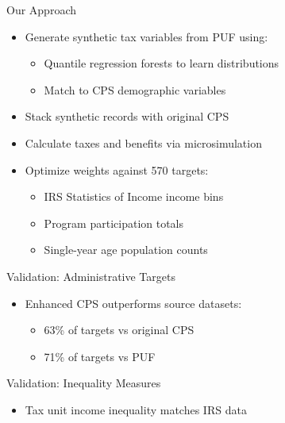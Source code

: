 \documentclass{beamer}
\begin{document}
\begin{frame}{Our Approach}
    \begin{itemize}
        \item Generate synthetic tax variables from PUF using:
        \begin{itemize}
            \item Quantile regression forests to learn distributions
            \item Match to CPS demographic variables
        \end{itemize}
        \pause
        \item Stack synthetic records with original CPS
        \pause
        \item Calculate taxes and benefits via microsimulation
        \pause
        \item Optimize weights against 570 targets:
        \begin{itemize}
            \item IRS Statistics of Income income bins
            \item Program participation totals
            \item Single-year age population counts
        \end{itemize}
    \end{itemize}
\end{frame}

\begin{frame}{Validation: Administrative Targets}
    \begin{itemize}
        \item Enhanced CPS outperforms source datasets:
        \begin{itemize}
            \item 63\% of targets vs original CPS
            \item 71\% of targets vs PUF
        \end{itemize}
    \end{itemize}
\end{frame}

\begin{frame}{Validation: Inequality Measures}
    \begin{itemize}
        \item Tax unit income inequality matches IRS data
        \begin{table}
            \centering
            \begin{table}
                \centering
                
            \end{table}
        \end{table}
    \end{itemize}
\end{frame}
\end{document}
